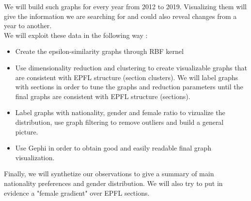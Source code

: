 \documentclass[12pt]{article}
\begin{document}
We will build such graphs for every year from 2012 to 2019. Visualizing them will give the information we are searching for and could also reveal changes from a year to another.\\

We will exploit these data in the following way :\\
\begin{itemize}
\item Create the epsilon-similarity graphs through RBF kernel
\item Use dimensionality reduction and clustering to create visualizable graphs that are consistent with EPFL structure (section clusters). We will  label graphs with sections in order to tune the graphs and reduction parameters until the final graphs are consistent with EPFL structure (sections).
\item Label graphs with nationality, gender and female ratio to vizualize the distribution, use graph filtering to remove outliers and build a general picture.
\item Use Gephi in order to obtain good and easily readable final graph visualization.
\end{itemize}

Finally, we will synthetize our observations to give a summary of main nationality preferences and gender distribution. We will also try to put in evidence a "female gradient" over EPFL sections.
\end{document}
